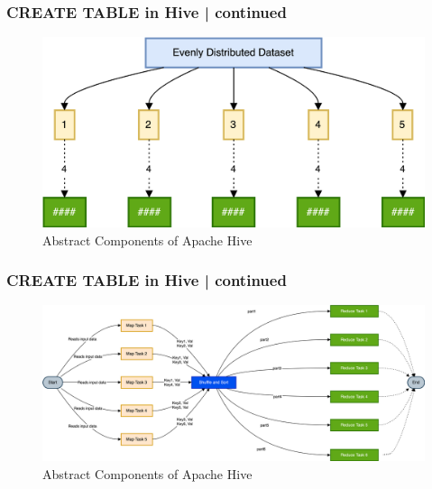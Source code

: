 		\begin{frame}
			\frametitle{CREATE TABLE in Hive | continued}  
			\vspace{-0.5cm}		
			\begin{tcolorbox}[colback=white,colframe=black,title= Part 10: Data Skewing]	
				\begin{figure}
					\includegraphics[width=\textwidth,height=.6\textheight,keepaspectratio]{./Figures/chapter-03/dwh_hive-unskweed_dt.png}	
					\caption{Abstract Components of Apache Hive}
				\end{figure}
			\end{tcolorbox}
		\end{frame}
		\begin{frame}
			\frametitle{CREATE TABLE in Hive | continued}  
			\vspace{-0.5cm}		
			\begin{tcolorbox}[colback=white,colframe=black,title= Part 10: Data Skewing]	
				\begin{figure}
					\includegraphics[width=\textwidth,height=.7\textheight,keepaspectratio]{./Figures/chapter-03/dwh_hive-unskweed_dt_mr.png}	
					\caption{Abstract Components of Apache Hive}
				\end{figure}
			\end{tcolorbox}
		\end{frame}	
		
